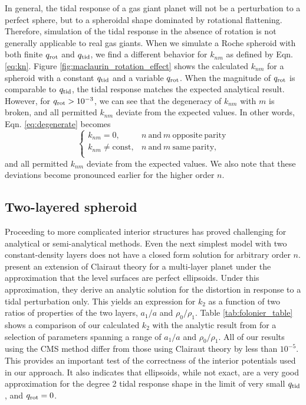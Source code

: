 In general, the tidal response of a gas giant planet will not be a perturbation to a
perfect sphere, but to a spheroidal shape dominated by rotational flattening.
Therefore, simulation of the tidal response in the absence of rotation is not
generally applicable to real gas giants. When we simulate a Roche spheroid with
both finite $q_{\rm rot}$ and $q_{\rm tid}$, we find a different behavior for
$k_{nm}$ as defined by Eqn. \eqref{eq:kn}. Figure \ref{fig:maclaurin_rotation_effect}
shows the calculated $k_{nm}$ for a spheroid with a constant $q_{\rm tid}$
and a variable $q_{\rm rot}$. When the magnitude of $q_{\rm rot}$ is comparable to
$q_{\rm tid}$, the tidal response matches the expected analytical result. However,
for $q_{\rm rot}>10^{-3}$, we can see that the degeneracy of $k_{nm}$ with $m$ is
broken, and all permitted $k_{nm}$ deviate from the expected values. In other words,
Eqn.  \eqref{eq:degenerate} becomes
%
\begin{equation}
    \begin{cases}
        k_{nm}=0, & n \mathrm{~and~} m \mathrm{~opposite~parity} \\
        k_{nm}\neq\mathrm{const}, & n \mathrm{~and~} m \mathrm{~same~parity}, \\
    \end{cases}
    \label{eq:nondegenerate}
\end{equation}
%
and all permitted $k_{nm}$ deviate from the expected values. We also note that these
deviations become pronounced earlier for the higher order $n$.

\subsection{Two-layered spheroid} \label{two_layer}

Proceeding to more complicated interior structures has proved challenging for
analytical or semi-analytical methods. Even the next simplest model with two
constant-density layers does not have a closed form solution for arbitrary order $n$.
\citet{folonier2015} present an extension of Clairaut theory for a multi-layer planet
under the approximation that the level surfaces are perfect ellipsoids. Under this
approximation, they derive an analytic solution for the distortion in response to a
tidal perturbation only. This yields an expression for $k_2$ as a function of two
ratios of properties of the two layers, $a_1/a$ and $\rho_0/\rho_1$. Table
\ref{tab:folonier_table} shows a comparison of our calculated $k_2$ with the analytic
result from \citet{folonier2015} for a selection of parameters spanning a range of
$a_1/a$ and $\rho_0/\rho_1$. All of our results using the CMS method differ from
those using Clairaut theory by less than $10^{-5}$. This provides an important test
of the correctness of the interior potentials used in our approach. It also indicates
that ellipsoids, while not exact, are a very good approximation for the degree 2
tidal response shape in the limit of very small $q_{\rm tid}$, and $q_{\rm rot}=0$. 

